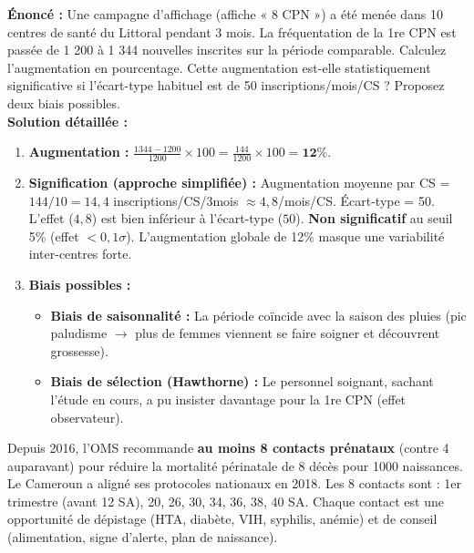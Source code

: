 \documentclass[11pt]{article}
\begin{document}
\begin{exoresolu}
\textbf{Énoncé :} Une campagne d'affichage (affiche « 8 CPN ») a été menée dans 10 centres de santé du Littoral pendant 3 mois. La fréquentation de la 1re CPN est passée de 1 200 à 1 344 nouvelles inscrites sur la période comparable. Calculez l'augmentation en pourcentage. Cette augmentation est-elle statistiquement significative si l'écart-type habituel est de 50 inscriptions/mois/CS ? Proposez deux biais possibles.
\\
\textbf{Solution détaillée :}
\begin{enumerate}
    \item \textbf{Augmentation :} $\frac{1344 - 1200}{1200} \times 100 = \frac{144}{1200} \times 100 = \mathbf{12 \%}$.
    \item \textbf{Signification (approche simplifiée) :} Augmentation moyenne par CS = $144 / 10 = 14,4$ inscriptions/CS/3mois $\approx 4,8$/mois/CS. Écart-type = 50. L'effet ($4,8$) est bien inférieur à l'écart-type ($50$). \textbf{Non significatif} au seuil 5\% (effet $< 0,1 \sigma$). L'augmentation globale de 12\% masque une variabilité inter-centres forte.
    \item \textbf{Biais possibles :}
    \begin{itemize}
        \item \textbf{Biais de saisonnalité :} La période coïncide avec la saison des pluies (pic paludisme $\rightarrow$ plus de femmes viennent se faire soigner et découvrent grossesse).
        \item \textbf{Biais de sélection (Hawthorne) :} Le personnel soignant, sachant l'étude en cours, a pu insister davantage pour la 1re CPN (effet observateur).
    \end{itemize}
\end{enumerate}
\end{exoresolu}

\begin{savaistu}
Depuis 2016, l'OMS recommande \textbf{au moins 8 contacts prénataux} (contre 4 auparavant) pour réduire la mortalité périnatale de 8 décès pour 1000 naissances. Le Cameroun a aligné ses protocoles nationaux en 2018. Les 8 contacts sont : 1er trimestre (avant 12 SA), 20, 26, 30, 34, 36, 38, 40 SA. Chaque contact est une opportunité de dépistage (HTA, diabète, VIH, syphilis, anémie) et de conseil (alimentation, signe d'alerte, plan de naissance).
\end{savaistu}
\end{document}
